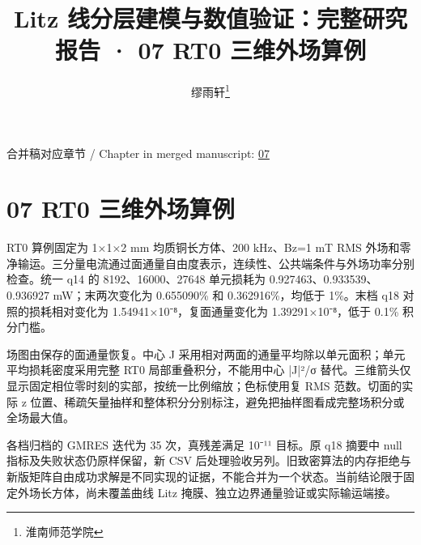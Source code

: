 \documentclass[journal,10pt]{IEEEtran}
\begin{document}
\title{Litz 线分层建模与数值验证：完整研究报告 · 07 RT0 三维外场算例}
\author{缪雨轩\thanks{淮南师范学院}}

\maketitle
\noindent 合并稿对应章节 / Chapter in merged manuscript: \href{report_zh-CN_ieee.pdf#chapter-07}{07}\par
\FloatBarrier
\section*{07 RT0 三维外场算例}
\hypertarget{chapter-07}{}
RT0 算例固定为 1×1×2 mm 均质铜长方体、200 kHz、Bz=1 mT RMS 外场和零净输运。三分量电流通过面通量自由度表示，连续性、公共端条件与外场功率分别检查。统一 q14 的 8192、16000、27648 单元损耗为 0.927463、0.933539、0.936927 mW；末两次变化为 0.655090\% 和 0.362916\%，均低于 1\%。末档 q18 对照的损耗相对变化为 1.54941×10⁻⁸，复面通量变化为 1.39291×10⁻⁸，低于 0.1\% 积分门槛。


场图由保存的面通量恢复。中心 J 采用相对两面的通量平均除以单元面积；单元平均损耗密度采用完整 RT0 局部重叠积分，不能用中心 |J|²/σ 替代。三维箭头仅显示固定相位零时刻的实部，按统一比例缩放；色标使用复 RMS 范数。切面的实际 z 位置、稀疏矢量抽样和整体积分分别标注，避免把抽样图看成完整场积分或全场最大值。


各档归档的 GMRES 迭代为 35 次，真残差满足 10⁻¹¹ 目标。原 q18 摘要中 null 指标及失败状态仍原样保留，新 CSV 后处理验收另列。旧致密算法的内存拒绝与新版矩阵自由成功求解是不同实现的证据，不能合并为一个状态。当前结论限于固定外场长方体，尚未覆盖曲线 Litz 掩膜、独立边界通量验证或实际输运端接。
\end{document}
